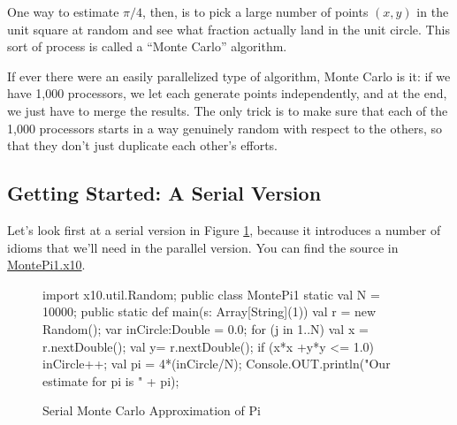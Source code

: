 One way to estimate $\pi/4$, then, is to pick a
large number of points $(x,y)$ in the unit square at random and see what fraction
actually land in the unit circle. This sort of process is called a ``Monte
Carlo'' algorithm.

If ever there 
were an easily parallelized type of algorithm, Monte Carlo is it: if we have 1,000
processors, we let each generate points independently, and at the end, we
just have to merge the results.  The only trick is to make sure that each of the 1,000
processors starts in a way genuinely random with respect to the others, so that
they don't just duplicate each other's efforts. 

\subsection{Getting Started: A Serial Version}
Let's look first at a serial version in Figure \ref{fig:mcpi}, 
because it introduces a number of \Xten{} idioms that we'll need in the
parallel version.  You can find the source in 
\href{http://dist.codehaus.org/x10/documentation/guide/src/montePi/MontePi1.x10}{MontePi1.x10}.
\begin{figure}[!htbp]
\hrulefill
\begin{xtennum}[]
import x10.util.Random; 
public class MontePi1 {
    static val N = 10000; 
    public static def main(s: Array[String](1)) { 
        val r = new Random();   
        var inCircle:Double = 0.0; 
        for (j in 1..N) { 
            val x = r.nextDouble(); 
            val y=  r.nextDouble(); 
            if (x*x +y*y <= 1.0) inCircle++; 
        }  
        val pi = 4*(inCircle/N); 
        Console.OUT.println("Our estimate for pi is " + pi); 
    }
}
\end{xtennum}
\hrulefill
\caption{Serial Monte Carlo Approximation of Pi}\label{fig:mcpi}
\end{figure}
